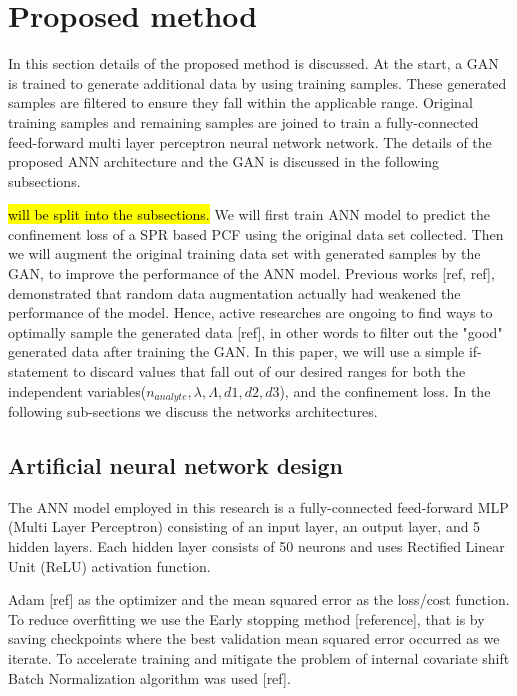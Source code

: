 \documentclass[draft, a4, 10pt, onecolumn]{IEEEtran}
\begin{document}
\section{Proposed method}
\label{sec:prop}

In this section details of the proposed method is discussed. At the start, a GAN is trained to generate additional data by using training samples. These generated samples are filtered to ensure they fall within the applicable range. Original training samples and remaining samples are joined to train a fully-connected feed-forward multi layer perceptron neural network network. The details of the proposed ANN architecture and the GAN is discussed in the following subsections.


\hl{will be split into the subsections.} We will first train ANN model to predict the confinement loss of a SPR based PCF using the original data set collected. Then we will augment the original training data set with generated samples by the GAN, to improve the performance of the ANN model.
Previous works [ref, ref], demonstrated that random data augmentation actually had weakened the performance of the model. Hence, active researches are ongoing to find ways to optimally sample the generated data [ref], in other words to filter out the "good" generated data after training the GAN. In this paper, we will use a simple if-statement to discard values that fall out of our desired ranges for both the independent variables($n_{analyte}, \lambda, \Lambda, d1, d2, d3$), and the confinement loss. In the following sub-sections we discuss the networks architectures.

\subsection{Artificial neural network design}
\label{ssec:ann}
The ANN model employed in this research is a fully-connected feed-forward MLP (Multi Layer Perceptron) consisting of an input layer, an output layer, and 5 hidden layers. Each hidden layer consists of 50 neurons and uses Rectified Linear Unit (ReLU) activation function. 

Adam [ref] as the optimizer and the mean squared error as the loss/cost function. To reduce overfitting we use the Early stopping method [reference], that is by saving checkpoints where the best validation mean squared error occurred as we iterate. To accelerate training and mitigate the problem of internal covariate shift Batch Normalization algorithm was used [ref].
\end{document}
